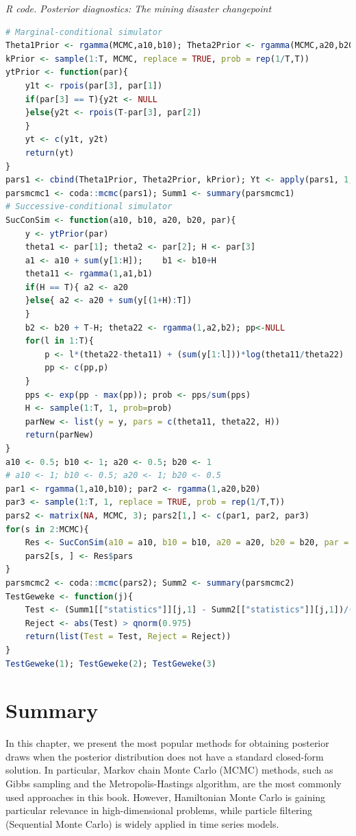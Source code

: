 \begin{tcolorbox}[enhanced,width=4.67in,center upper,
	fontupper=\large\bfseries,drop shadow southwest,sharp corners]
	\textit{R code. Posterior diagnostics: The mining disaster changepoint}
	\begin{VF}
		\begin{lstlisting}[language=R]
# Marginal-conditional simulator
Theta1Prior <- rgamma(MCMC,a10,b10); Theta2Prior <- rgamma(MCMC,a20,b20) 
kPrior <- sample(1:T, MCMC, replace = TRUE, prob = rep(1/T,T))
ytPrior <- function(par){
	y1t <- rpois(par[3], par[1])
	if(par[3] == T){y2t <- NULL
	}else{y2t <- rpois(T-par[3], par[2])
	}
	yt <- c(y1t, y2t)
	return(yt)
}
pars1 <- cbind(Theta1Prior, Theta2Prior, kPrior); Yt <- apply(pars1, 1, ytPrior)
parsmcmc1 <- coda::mcmc(pars1); Summ1 <- summary(parsmcmc1)
# Successive-conditional simulator
SucConSim <- function(a10, b10, a20, b20, par){
	y <- ytPrior(par) 
	theta1 <- par[1]; theta2 <- par[2]; H <- par[3]
	a1 <- a10 + sum(y[1:H]); 	b1 <- b10+H
	theta11 <- rgamma(1,a1,b1)
	if(H == T){ a2 <- a20
	}else{ a2 <- a20 + sum(y[(1+H):T])
	}
	b2 <- b20 + T-H; theta22 <- rgamma(1,a2,b2); pp<-NULL
	for(l in 1:T){
		p <- l*(theta22-theta11) + (sum(y[1:l]))*log(theta11/theta22)
		pp <- c(pp,p)
	}
	pps <- exp(pp - max(pp)); prob <- pps/sum(pps)
	H <- sample(1:T, 1, prob=prob)
	parNew <- list(y = y, pars = c(theta11, theta22, H))
	return(parNew)
}
a10 <- 0.5; b10 <- 1; a20 <- 0.5; b20 <- 1
# a10 <- 1; b10 <- 0.5; a20 <- 1; b20 <- 0.5
par1 <- rgamma(1,a10,b10); par2 <- rgamma(1,a20,b20) 
par3 <- sample(1:T, 1, replace = TRUE, prob = rep(1/T,T))
pars2 <- matrix(NA, MCMC, 3); pars2[1,] <- c(par1, par2, par3)
for(s in 2:MCMC){
	Res <- SucConSim(a10 = a10, b10 = b10, a20 = a20, b20 = b20, par = pars2[s-1,])
	pars2[s, ] <- Res$pars
}
parsmcmc2 <- coda::mcmc(pars2); Summ2 <- summary(parsmcmc2)
TestGeweke <- function(j){
	Test <- (Summ1[["statistics"]][j,1] - Summ2[["statistics"]][j,1])/(Summ1[["statistics"]][j,4]+Summ2[["statistics"]][j,4])^0.5
	Reject <- abs(Test) > qnorm(0.975)
	return(list(Test = Test, Reject = Reject))
}
TestGeweke(1); TestGeweke(2); TestGeweke(3)
\end{lstlisting}
	\end{VF}
\end{tcolorbox} 
  
\section{Summary}\label{sec55}
In this chapter, we present the most popular methods for obtaining posterior draws when the posterior distribution does not have a standard closed-form solution. In particular, Markov chain Monte Carlo (MCMC) methods, such as Gibbs sampling and the Metropolis-Hastings algorithm, are the most commonly used approaches in this book. However, Hamiltonian Monte Carlo is gaining particular relevance in high-dimensional problems, while particle filtering (Sequential Monte Carlo) is widely applied in time series models.

